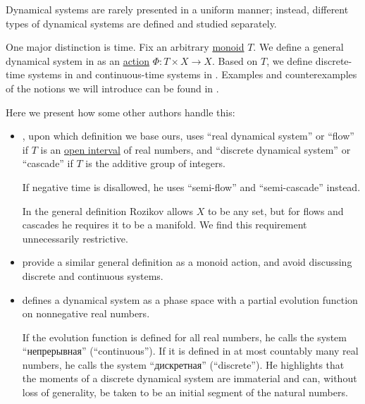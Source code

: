 \begin{remark}\label{rem:dynamical_system_time_etymology}
  Dynamical systems are rarely presented in a uniform manner; instead, different types of dynamical systems are defined and studied separately.

  One major distinction is time. Fix an arbitrary \hyperref[def:monoid]{monoid} \( T \). We define a general dynamical system in  as an \hyperref[def:monoid_action]{action} \( \Phi: T \times X \to X \). Based on \( T \), we define discrete-time systems in  and continuous-time systems in . Examples and counterexamples of the notions we will introduce can be found in .

  Here we present how some other authors handle this:
  \begin{itemize}
    \item {}, upon which definition we base ours, uses \enquote{real dynamical system} or \enquote{flow} if \( T \) is an \hyperref[def:order_interval/open]{open interval} of real numbers, and \enquote{discrete dynamical system} or \enquote{cascade} if \( T \) is the additive group of integers.

    If negative time is disallowed, he uses \enquote{semi-flow} and \enquote{semi-cascade} instead.

    In the general definition Rozikov allows \( X \) to be any set, but for flows and cascades he requires it to be a manifold. We find this requirement unnecessarily restrictive.

    \item {} provide a similar general definition as a monoid action, and avoid discussing discrete and continuous systems.

    \item {} defines a dynamical system as a phase space with a partial evolution function on nonnegative real numbers.

    If the evolution function is defined for all real numbers, he calls the system \enquote{непрерывная} (\enquote{continuous}). If it is defined in at most countably many real numbers, he calls the system \enquote{дискретная} (\enquote{discrete}). He highlights that the moments of a discrete dynamical system are immaterial and can, without loss of generality, be taken to be an initial segment of the natural numbers.


\end{itemize}
\end{remark}
